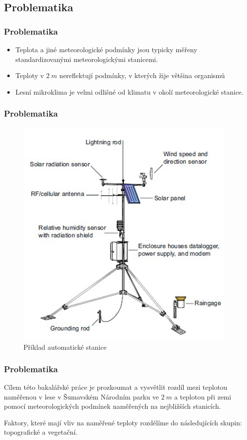 \documentclass[
	11pt, %
]{beamer}
\begin{document}

\subsection{Problematika}

\begin{frame}
	\frametitle{Problematika}
	\begin{itemize}
		\item Teplota a jiné meteorologické podmínky jsou typicky měřeny standardizovanými meteorologickými stanicemi.
		\item Teploty v $\SI{2}{m}$ nereflektují podmínky, v kterých žije většina organismů
		\item Lesní mikroklima je velmi odlišné od klimatu v okolí meteorologické stanice.
	\end{itemize}
\end{frame}

\begin{frame}
	\frametitle{Problematika}
	\begin{figure}
		\includegraphics[width=0.6\linewidth]{meteo_station.png}
		\caption{Příklad automatické stanice}
	\end{figure}
\end{frame}

\begin{frame}
	\frametitle{Problematika}
	Cílem této bakalářské práce je prozkoumat a vysvětlit rozdíl mezi teplotou naměřenou v lese v Šumavském Národním parku ve $\SI{2}{m}$ a teplotou při zemi pomocí meteorologických podmínek naměřených na nejbližších stanicích.
	\bigskip

	Faktory, které mají vliv na naměřené teploty rozdělíme do následujících skupin: topografické a vegetační.
\end{frame}
\end{document}
